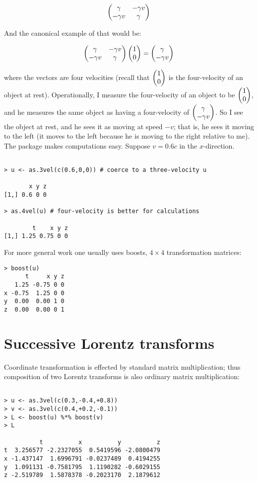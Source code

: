 \documentclass[ijoc,nonblindrev]{informs3} %
\begin{document}
\begin{equation*}
\begin{pmatrix} \gamma & -\gamma v \\ -\gamma v & \gamma\end{pmatrix}
\end{equation*}

And the canonical example of that would be:

\begin{equation*}
\begin{pmatrix} \gamma & -\gamma v \\ -\gamma
  v & \gamma\end{pmatrix}\begin{pmatrix}1 \\ 0\end{pmatrix}=\begin{pmatrix}\gamma \\ -\gamma v\end{pmatrix}
\end{equation*}

where the vectors are four velocities (recall that $\begin{pmatrix}1 \\ 0\end{pmatrix}$ is
the four-velocity of an object at rest).  Operationally, I measure the
four-velocity of an object to be $\begin{pmatrix}1 \\ 0\end{pmatrix}$, and he measures the
same object as having a four-velocity of $\begin{pmatrix}\gamma \\ -\gamma v\end{pmatrix}$.
So I see the object at rest, and he sees it as moving at speed $-v$;
that is, he sees it moving to the left (it moves to the left because
he is moving to the right relative to me).  The package makes
computations easy.  Suppose $v=0.6c$ in the $x$-direction.

\begin{verbatim}

> u <- as.3vel(c(0.6,0,0)) # coerce to a three-velocity u

       x y z 
[1,] 0.6 0 0

> as.4vel(u) # four-velocity is better for calculations

        t    x y z
[1,] 1.25 0.75 0 0

\end{verbatim}

For more general work one usually uses boosts, $4\times 4$
transformation matrices:

\begin{verbatim}
> boost(u)
      t     x y z
   1.25 -0.75 0 0 
x -0.75  1.25 0 0 
y  0.00  0.00 1 0 
z  0.00  0.00 0 1

\end{verbatim}

\section{Successive Lorentz transforms}

Coordinate transformation is effected by standard matrix
multiplication; thus composition of two Lorentz transforms is also
ordinary matrix multiplication:

\begin{verbatim}

> u <- as.3vel(c(0.3,-0.4,+0.8))
> v <- as.3vel(c(0.4,+0.2,-0.1))
> L <- boost(u) %*% boost(v)
> L

          t          x          y          z
t  3.256577 -2.2327055  0.5419596 -2.0800479
x -1.437147  1.6996791 -0.0237489  0.4194255
y  1.091131 -0.7581795  1.1190282 -0.6029155
z -2.519789  1.5878378 -0.2023170  2.1879612

\end{verbatim}
\end{document}
